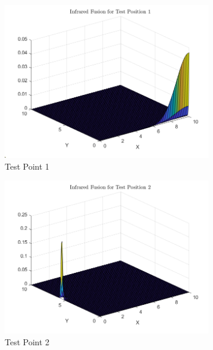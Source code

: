 \documentclass[12pt]{article}
\begin{document}
\begin{figure}[H]
    \centering
    \begin{subfigure}[h]{0.45\textwidth}
        \includegraphics[width=\textwidth]{images/IR_FusionA1.png}
        \caption{Test Point 1}
        \label{fig:IR-Fus-1}
    \end{subfigure}
    \begin{subfigure}[h]{0.45\textwidth}
        \includegraphics[width=\textwidth]{images/IR_FusionA2.png}
        \caption{Test Point 2}
        \label{fig:IR-Fus-2}
    \end{subfigure}
    \begin{subfigure}[h]{0.45\textwidth}

\end{subfigure}
\end{figure}
\end{document}
